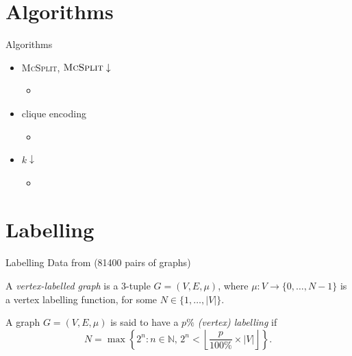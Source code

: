 \documentclass{beamer}
\begin{document}
\section{Algorithms}
\begin{frame}{Algorithms}
  \begin{itemize}
  \item \textsc{McSplit}, $\textsc{McSplit}\downarrow$
    \begin{itemize}
    \item \parencite{DBLP:conf/ijcai/McCreeshPT17}
    \end{itemize}
  \item clique encoding
    \begin{itemize}
    \item \parencite{DBLP:conf/cp/McCreeshNPS16}
    \end{itemize}
  \item $k\downarrow$
    \begin{itemize}
    \item \parencite{DBLP:conf/aaai/HoffmannMR17}
    \end{itemize}
  \end{itemize}
\end{frame}

\section{Labelling}
\begin{frame}{Labelling}
  Data from \cite{foggia2001-2, DBLP:journals/prl/SantoFSV03} (\num{81400} pairs
  of graphs)
  \pause
  \begin{definition}
    A \emph{vertex-labelled graph} is a 3-tuple $G = (V, E, \mu)$, where $\mu
    \colon V \to \{ 0, \dots, N - 1 \}$ is a vertex labelling function, for some
    $N \in \{ 1, \dots, |V| \}$.
  \end{definition}
  \pause
  \begin{definition}
    A graph $G = (V, E, \mu)$ is said to have a \emph{$p\%$ (vertex) labelling} if
    \[ N = \max \left\{ 2^n : n \in \mathbb{N},\, 2^n < \left\lfloor \frac{p}{100\%}
          \times |V| \right\rfloor \right\}. \]
  \end{definition}
\end{frame}
\end{document}
